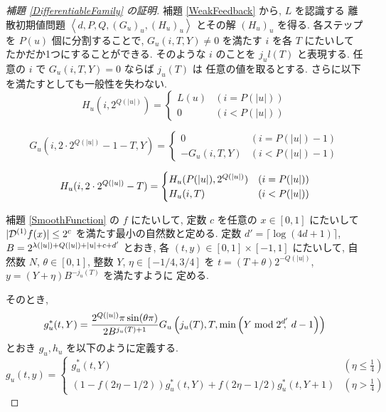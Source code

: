 \begin{proof}[\rm 補題 \ref{DifferentiableFamily} の証明]
 補題 \ref{WeakFeedback} から, $L$ を認識する 
 離散初期値問題 $\left< d, P, Q,(G_u)_u,(H_u)_u \right>$
 とその解 $(H_u)_u$ を得る.
 各ステップを $P(u)$ 個に分割することで, $G_u(i, T, Y) \not = 0$ を満たす
 $i$ を各 $T$ にたいしてたかだか1つにすることができる. そのような $i$ のことを 
 $j_ul(T)$ と表現する. 任意の $i$ で $G_u(i, T, Y) = 0$ ならば $j_u(T)$ は
 任意の値を取るとする. 
 さらに以下を満たすとしても一般性を失わない.
 \begin{equation}
  H_u(i, 2^{Q(|u|)}) = \begin{cases}
			L(u) & (i=P(|u|)) \\
			0 & (i<P(|u|))
		       \end{cases}
 \end{equation}

 \begin{equation}
  G_u(i, 2\cdot 2^{Q(|u|)} - 1 - T, Y) 
   = \begin{cases}
      0 & (i=P(|u|)-1) \\
      -G_u(i,T,Y) & (i<P(|u|)-1)
     \end{cases}
 \end{equation}

 \begin{equation}
  H_u(i, 2 \cdot 2^{Q(|u|)} - T) 
  = \begin{cases}
    H_u(P(|u|), 2^{Q(|u|)}) & (i={P(|u|)}) \\
    H_u(i, T) &  (i<P(|u|))
    \end{cases}
 \end{equation}

  補題 \ref{SmoothFunction} の $f$ にたいして, 
 定数 $c$ を任意の $x \in [0,1]$ にたいして $|\mathcal D^{(1)}f(x)| \le 2^c$ を満たす最小の自然数と定める.
 定数 $d' = \lceil \log (4d + 1) \rceil$, 
 $B = 2^{{\lambda(|u|)} + {Q(|u|)} + |u| + c + d'}$ とおき, 
 各 $(t, y) \in [0,1] \times [-1, 1]$ にたいして,
 自然数 $N$, $\theta \in [0,1]$, 整数 $Y$, $\eta \in [-1/4, 3/4]$ を
 $t = (T + \theta)2^{-Q(|u|)}$, $y = (Y + \eta)B^{-j_u(T)}$ を満たすように
 定める.
 
 そのとき,
 \begin{equation}
  g^*_u(t, Y) = \frac{2^{Q(|u|)} \pi \sin (\theta\pi)}{2B^{j_u(T)+1}} 
   G_u\left( j_u(T), T, \min \left(Y \bmod 2^{d'}\!\!\!,\ d-1 \right) \right)
 \end{equation}
 とおき $g_u, h_u$ を以下のように定義する.
 \begin{equation}
  g_u(t,y) 
  = \begin{cases}
     g^*_u(t, Y)& (\eta \le \frac 1 4) \\
     ( 1-f ( 2\eta - 1/2)) g^*_u(t, Y) 
     + f ( 2\eta -  1/2) g^*_u(t, Y+1)
     & (\eta > \frac 1 4)
    \end{cases}
  \label{eq:gu}
 \end{equation}


\end{proof}
